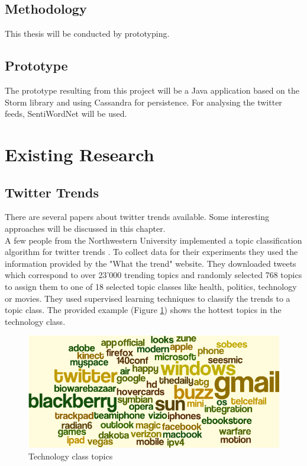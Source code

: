 \documentclass[a4paper]{article}
\begin{document}
\subsection{Methodology}
This thesis will be conducted by prototyping. 
\subsection{Prototype}
The prototype resulting from this project will be a Java application based on the Storm library and using Cassandra for persistence. For analysing the twitter feeds, SentiWordNet will be used. 

\section{Existing Research}
\subsection{Twitter Trends}
There are several papers about twitter trends available. Some interesting approaches will be discussed in this chapter.\\

A few people from the Northwestern University implemented a topic classification algorithm for twitter trends \cite{leeEtAl2011}. To collect data for their experiments they used the information provided by the "What the trend" website. They downloaded tweets which correspond to over 23'000 trending topics and randomly selected 768 topics to assign them to one of 18 selected topic classes like health, politics, technology or movies. They used supervised learning techniques to classify the trends to a topic class. The provided example (Figure \ref{techClass}) shows the hottest topics in the technology class.
\begin{figure}[h!]
	\centering
	\includegraphics[scale=0.35]{images/technologyClass.png}
	\caption{Technology class topics}
	\label{techClass}
\end{figure}
\end{document}
